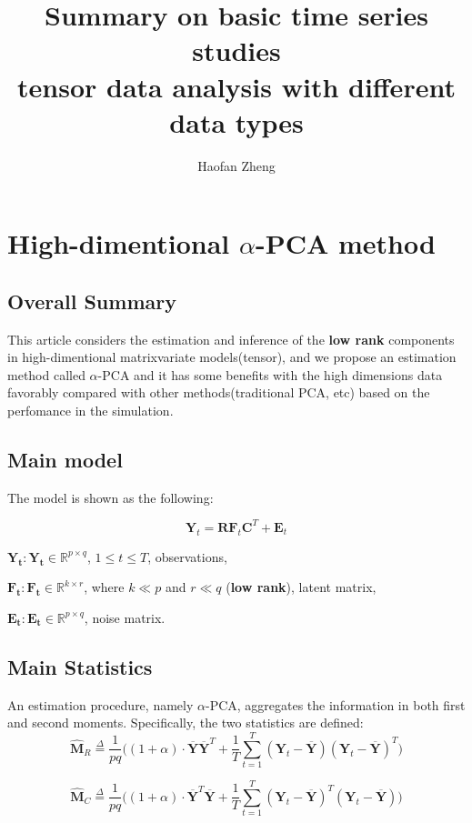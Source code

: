 \documentclass{article}[12pt]
\title{\textbf{Summary on basic time series studies\\ \large tensor data analysis with different data types}}
\author{Haofan Zheng}
\date{}
\begin{document}
\maketitle
\newpage
\tableofcontents
\newpage

\section{High-dimentional $\alpha$-PCA method}
\subsection{Overall Summary}
This article considers the estimation and inference of the \textbf{low rank} components in high-dimentional matrixvariate models(tensor), and we propose an estimation method called $\alpha$-PCA and it has some benefits with the high dimensions data favorably compared with other methods(traditional PCA, etc) based on the perfomance in the simulation.



\subsection{Main model}
The model is shown as the following:

$$\mathbf{Y}_t = \mathbf{R}\mathbf{F}_t\mathbf{C}^T+\mathbf{E}_t$$

$\mathbf{Y_t}: \mathbf{Y_t}\in \mathbb{R}^{p\times q}$, $1\leq t \leq T$, observations,

$\mathbf{F_t}: \mathbf{F_t}\in \mathbb{R}^{k\times r}$, where $k\ll p$ and $r\ll q$ (\textbf{low rank}), latent matrix,

$\mathbf{E_t}: \mathbf{E_t}\in \mathbb{R}^{p \times q}$, noise matrix.

\subsection{Main Statistics}
An estimation procedure, namely $\alpha$-PCA, aggregates the information in both first and second moments. Specifically, the two statistics are defined:
$$\mathbf{\widehat{M}}_R  \overset{\Delta}{=} \dfrac{1}{pq}\Bigg((1+\alpha) \cdot \mathbf{\overline{Y}}\mathbf{\overline{Y}}^T+\dfrac{1}{T}\sum\limits_{t=1}^T(\mathbf{Y}_t-\mathbf{\overline{Y}})(\mathbf{Y}_t-\mathbf{\overline{Y}})^T\Bigg)$$

$$\mathbf{\widehat{M}}_C  \overset{\Delta}{=} \dfrac{1}{pq}\Bigg((1+\alpha) \cdot  \mathbf{\overline{Y}}^T\mathbf{\overline{Y}}+\dfrac{1}{T}\sum\limits_{t=1}^T(\mathbf{Y}_t-\mathbf{\overline{Y}})^T(\mathbf{Y}_t-\mathbf{\overline{Y}})\Bigg)$$
\end{document}
